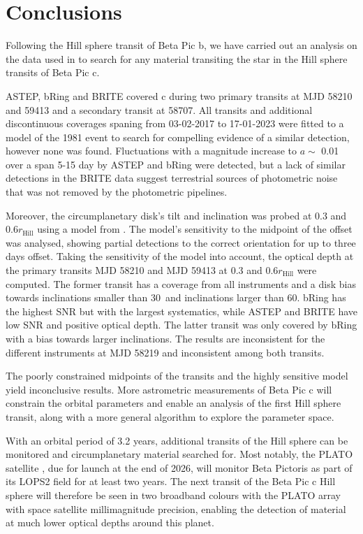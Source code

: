 \section{Conclusions}

Following the Hill sphere transit of Beta Pic b, we have carried out an analysis on the data used in \citet{Kenworthy_2021} to search for any material transiting the star in the Hill sphere transits of Beta Pic c.

ASTEP, bRing and BRITE covered \pic c during two primary transits at MJD 58210 and 59413 and a secondary transit at 58707.
%
All transits and additional discontinuous coverages spaning from 03-02-2017 to 17-01-2023 were fitted to a model of the 1981 event to search for compelling evidence of a similar detection, however none was found.
%
Fluctuations with a magnitude increase to $a \sim$ 0.01 over a span 5-15 day by ASTEP and bRing were detected, but a lack of similar detections in the BRITE data suggest terrestrial sources of photometric noise that was not removed by the photometric pipelines.

Moreover, the circumplanetary disk's tilt and inclination was probed at 0.3 and 0.6$r_{\text{Hill}}$ using a model from \cite{Kenworthy_2021}.
%
The model's sensitivity to the midpoint of the offset was analysed, showing partial detections to the correct orientation for up to three days offset.
%
Taking the sensitivity of the model into account, the optical depth at the primary transits MJD 58210 and MJD 59413 at 0.3 and 0.6$r_{\text{Hill}}$ were computed.
%
The former transit has a coverage from all instruments and a disk bias towards inclinations smaller than 30\textdegree \ and inclinations larger than 60\textdegree.
%
bRing has the highest SNR but with the largest systematics, while ASTEP and BRITE have low SNR and positive optical depth.
%
The latter transit was only covered by bRing with a bias towards larger inclinations.
%
The results are inconsistent for the different instruments at MJD 58219 and inconsistent among both transits.

The poorly constrained midpoints of the transits and the highly sensitive model yield inconclusive results. 
%
More astrometric measurements of Beta Pic c will constrain the orbital parameters and enable an analysis of the first Hill sphere transit, along with a more general algorithm to explore the parameter space.

With an orbital period of 3.2 years, additional transits of the Hill sphere can be monitored and circumplanetary material searched for.
%
Most notably, the PLATO satellite \citep{2025ExA....59...26R}, due for launch at the end of 2026, will monitor Beta Pictoris as part of its LOPS2 field for at least two years. 
%
The next transit of the Beta Pic c Hill sphere will therefore be seen in two broadband colours with the PLATO array with space satellite millimagnitude precision, enabling the detection of material at much lower optical depths around this planet.